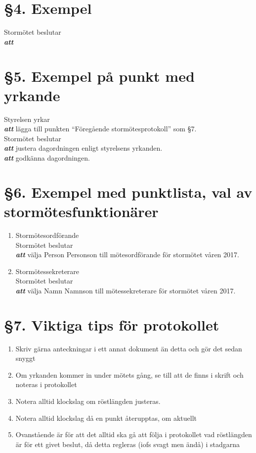 \documentclass[a4paper, 11pt]{article}
\begin{document}
\section*{§4. Exempel}
Stormötet beslutar\\
 \textbf{\textit{att}}

\section*{§5. Exempel på punkt med yrkande}
Styrelsen yrkar\\
\textbf{\textit{att}} lägga till punkten ``Föregående stormötesprotokoll'' som §7.\\

\noindent Stormötet beslutar\\
\textbf{\textit{att}} justera dagordningen enligt styrelsens yrkanden.\\
\textbf{\textit{att}} godkänna dagordningen.

\section*{§6. Exempel med punktlista, val av stormötesfunktionärer} 
\begin{enumerate}[label=(\alph*)]
    \item Stormötesordförande\\
    
    Stormötet beslutar\\
    \textbf{\textit{att}} välja Person Personson till mötesordförande för stormötet våren 2017. 
    \item Stormötessekreterare\\
    
    Stormötet beslutar\\
    \textbf{\textit{att}} välja Namn Namnson till mötessekreterare för stormötet våren 2017.
    \end{enumerate}
 \section*{§7. Viktiga tips för protokollet}
 \begin{enumerate}[label=(\alph*)]
 \item Skriv gärna anteckningar i ett annat dokument än detta och gör det sedan snyggt
 \item Om yrkanden kommer in under mötets gång, se till att de finns i skrift och noteras i protokollet
 \item Notera alltid klockslag om röstlängden justeras. 
 \item Notera alltid klockslag då en punkt återupptas, om aktuellt
 \item Ovanstående är för att det alltid ska gå att följa i protokollet vad röstlängden är för ett givet beslut, då detta regleras (iofs svagt men ändå) i stadgarna
    \end{enumerate}
    
\end{document}
